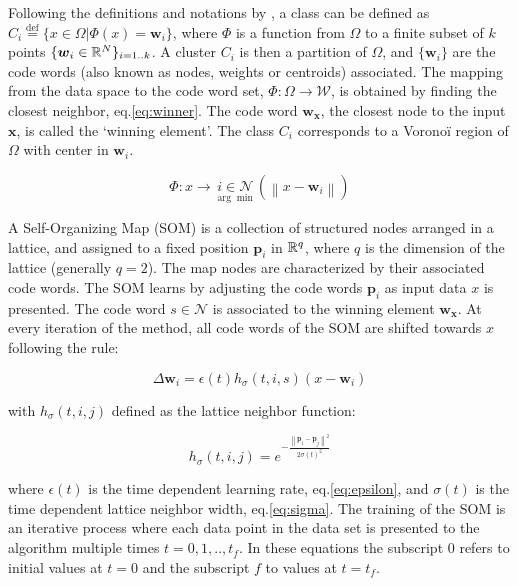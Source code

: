 Following the definitions and notations by \citep{[REF 23 in ROUGIER??]}, a class can be defined as $C_i\overset{\text{def}}{=} \{x\in\Omega | \Phi(x)=\boldsymbol{w}_i\}$, where $\Phi$ is a function from $\Omega$ to a finite subset of $k$ points $\{\boldsymbol{w}_i\in\Bbb R^N\}_{i=1..k}$. A cluster $C_i$ is then a partition of $\Omega$, and $\{\boldsymbol{w}_i\}$ are the code words (also known as nodes, weights or centroids) associated. The mapping from the data space to the code word set, $\Phi: \Omega\rightarrow\mathcal{W}$, is obtained by finding the closest neighbor, eq.\eqref{eq:winner}. The code word $\boldsymbol{w_x}$, the closest node to the input $\boldsymbol{x}$, is called the `winning element'. The class $C_i$ corresponds to a Vorono\"i region of $\Omega$ with center in $\boldsymbol{w}_i$.

\begin{equation}
\Phi: x \rightarrow  \underset{\arg\min}{i\in\mathcal{N}}\left( \left\lVert x - \boldsymbol{w}_i \right\rVert \right) \label{eq:winner}
\end{equation}

A Self-Organizing Map (SOM) is a collection of structured nodes arranged in a lattice, and assigned to a fixed position $\boldsymbol{p}_i$ in $\Bbb R^q$, where $q$ is the dimension of the lattice (generally $q=2$). The map nodes are characterized by their associated code words. The SOM learns by adjusting the code words $\boldsymbol{p}_i$ as input data $x$ is presented. The code word $s \in \mathcal{N}$ is associated to the winning element $\boldsymbol{w_x}$. At every iteration of the method, all code words of the SOM are shifted towards $x$ following the rule:

\begin{equation}
\Delta \boldsymbol{w}_i = \epsilon(t)h_\sigma(t,i,s)(x-\boldsymbol{w}_i) \label{eq:learnsom}
\end{equation}

with $h_\sigma(t,i,j)$ defined as the lattice neighbor function:

\begin{equation}
h_\sigma(t,i,j) = e^{-\frac{\left\lVert \boldsymbol{p}_i - \boldsymbol{p}_j \right\rVert^2}{2\sigma(t)^2}} \label{eq:neigsom}
\end{equation}

where $\epsilon(t)$ is the time dependent learning rate, eq.\eqref{eq:epsilon}, and $\sigma(t)$ is the time dependent lattice neighbor width, eq.\eqref{eq:sigma}. The training of the SOM is an iterative process where each data point in the data set is presented to the algorithm multiple times $t={0, 1,..,t_f}$. In these equations the subscript $0$ refers to initial values at $t=0$ and the subscript $f$ to values at $t=t_f$.

